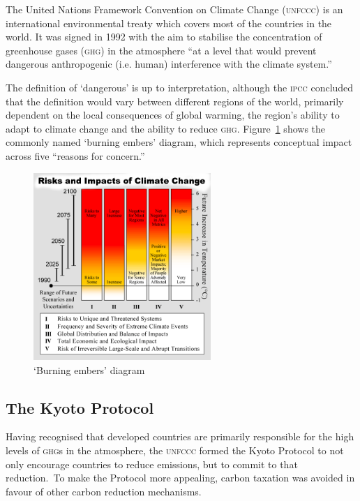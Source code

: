 The United Nations Framework Convention on Climate Change (\textsc{unfccc}) is an international environmental treaty which covers most of the countries in the world. It was signed in 1992 with the aim to stabilise the concentration of greenhouse gases (\textsc{ghg}) in the atmosphere ``at a level that would prevent dangerous anthropogenic (i.e. human) interference with the climate system.''~\cite{IPCC-synthesis-01-question1}

The definition of `dangerous' is up to interpretation, although the \textsc{ipcc} concluded that the definition would vary between different regions of the world, primarily dependent on the local consequences of global warming, the region's ability to adapt to climate change and the ability to reduce \textsc{ghg}. Figure~\ref{fig:burning_embers} shows the commonly named `burning embers' diagram, which represents conceptual impact across five ``reasons for concern.''

\begin{figure}[h!]
	\centering
	\includegraphics[width=0.6\textwidth]{img/Risks_and_Impacts_of_Global_Warming.png}
	\caption{`Burning embers' diagram~\cite{IPCC-workinggroup-01}}
	\label{fig:burning_embers}
\end{figure}

\subsection{The Kyoto Protocol}

Having recognised that developed countries are primarily responsible for the high levels of \textsc{ghg}s in the atmosphere, the \textsc{unfccc} formed the Kyoto Protocol to not only encourage countries to reduce emissions, but to commit to that reduction.~\cite{UNFCCC-kyoto-summary}To make the Protocol more appealing, carbon taxation was avoided in favour of other carbon reduction mechanisms. 


